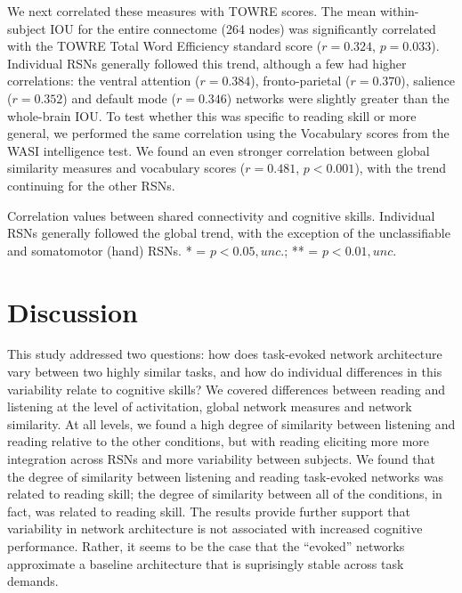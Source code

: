 We next correlated these measures with TOWRE scores. The mean within-subject IOU for the entire connectome (264 nodes) was significantly correlated with the TOWRE Total Word Efficiency standard score ($r = 0.324$, $p = 0.033$). Individual RSNs generally followed this trend, although a few had higher correlations: the ventral attention ($r=0.384$), fronto-parietal ($r=0.370$), salience ($r=0.352$) and default mode ($r=0.346$) networks were slightly greater than the whole-brain IOU. To test whether this was specific to reading skill or more general, we performed the same correlation using the Vocabulary scores from the WASI intelligence test. We found an even stronger correlation between global similarity measures and vocabulary scores ($r = 0.481$, $p < 0.001$), with the trend continuing for the other RSNs. 

\begin{table}[t!]
	\renewcommand{\tabcolsep}{0.09cm}
	\centering
	
	\caption[Correlation values between shared connectivity and cognitive skill]{Correlation values between shared connectivity and cognitive skills. Individual RSNs generally followed the global trend, with the exception of the unclassifiable and somatomotor (hand) RSNs. * = $p < 0.05, unc.$; ** = $p < 0.01, unc.$}
	\label{table:ch4-rsn-similarity-to-reading}
\end{table}

\section{Discussion}

This study addressed two questions: how does task-evoked network architecture vary between two highly similar tasks, and how do individual differences in this variability relate to cognitive skills? We covered differences between reading and listening at the level of activitation, global network measures and network similarity. At all levels, we found a high degree of similarity between listening and reading relative to the other conditions, but with reading eliciting more more integration across RSNs and more variability between subjects. We found that the degree of similarity between listening and reading task-evoked networks was related to reading skill; the degree of similarity between all of the conditions, in fact, was related to reading skill. The results provide further support that variability in network architecture is not associated with increased cognitive performance. Rather, it seems to be the case that the ``evoked'' networks approximate a baseline architecture that is suprisingly stable across task demands.

